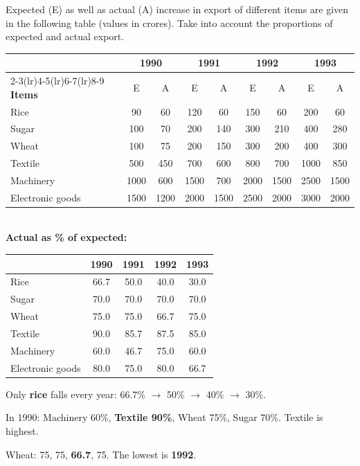 Expected (E) as well as actual (A) increase in export of different items are given in the following table (values in crores). Take into account the proportions of expected and actual export.
\begin{center}\small
\begin{tabular}{l*{8}{c}}\toprule
& \multicolumn{2}{c}{1990} & \multicolumn{2}{c}{1991} & \multicolumn{2}{c}{1992} & \multicolumn{2}{c}{1993}\\\cmidrule(lr){2-3}\cmidrule(lr){4-5}\cmidrule(lr){6-7}\cmidrule(lr){8-9}
\textbf{Items} & E & A & E & A & E & A & E & A\\\midrule
Rice & 90 & 60 & 120 & 60 & 150 & 60 & 200 & 60\\ Sugar & 100 & 70 & 200 & 140 & 300 & 210 & 400 & 280\\ Wheat & 100 & 75 & 200 & 150 & 300 & 200 & 400 & 300\\ Textile & 500 & 450 & 700 & 600 & 800 & 700 & 1000 & 850\\ Machinery & 1000 & 600 & 1500 & 700 & 2000 & 1500 & 2500 & 1500\\ Electronic goods & 1500 & 1200 & 2000 & 1500 & 2500 & 2000 & 3000 & 2000\\\bottomrule
\end{tabular}\\[4pt]
\textbf{Actual as \% of expected:}\\[2pt]
\begin{tabular}{lcccc}\toprule & 1990 & 1991 & 1992 & 1993\\\midrule
Rice & 66.7 & 50.0 & 40.0 & 30.0\\ Sugar & 70.0 & 70.0 & 70.0 & 70.0\\ Wheat & 75.0 & 75.0 & 66.7 & 75.0\\ Textile & 90.0 & 85.7 & 87.5 & 85.0\\ Machinery & 60.0 & 46.7 & 75.0 & 60.0\\ Electronic goods & 80.0 & 75.0 & 80.0 & 66.7\\\bottomrule
\end{tabular}
\end{center}

Only \textbf{rice} falls every year: 66.7\% $\rightarrow$ 50\% $\rightarrow$ 40\% $\rightarrow$ 30\%.

In 1990: Machinery 60\%, \textbf{Textile 90\%}, Wheat 75\%, Sugar 70\%. Textile is highest.

Wheat: 75, 75, \textbf{66.7}, 75. The lowest is \textbf{1992}.

